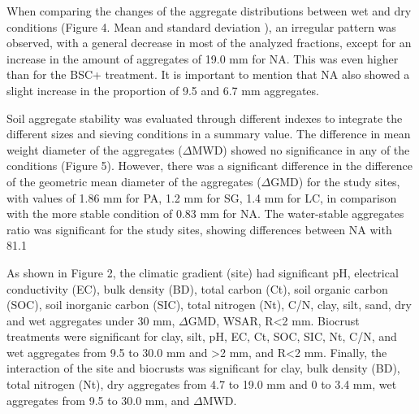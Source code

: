 
When comparing the changes of the aggregate distributions between wet and dry conditions (Figure 4. Mean and standard deviation ), an irregular pattern was observed, with a general decrease in most of the analyzed fractions, except for an increase in the amount of aggregates of 19.0 mm for NA. This was even higher than for the BSC+ treatment. It is important to mention that NA also showed a slight increase in the proportion of 9.5 and 6.7 mm aggregates.


Soil aggregate stability was evaluated through different indexes to integrate the different sizes and sieving conditions in a summary value. The difference in mean weight diameter of the aggregates ($\Delta$MWD) showed no significance in any of the conditions (Figure 5). However, there was a significant difference in the difference of the geometric mean diameter of the aggregates ($\Delta$GMD) for the study sites, with values of 1.86 mm for PA, 1.2 mm for SG, 1.4 mm for LC, in comparison with the more stable condition of 0.83 mm for NA. The water-stable aggregates ratio was significant for the study sites, showing differences between NA with 81.1%


As shown in Figure 2, the climatic gradient (site) had significant pH, electrical conductivity (EC), bulk density (BD), total carbon (Ct), soil organic carbon (SOC), soil inorganic carbon (SIC), total nitrogen (Nt), C/N, clay, silt, sand, dry and wet aggregates under 30 mm, $\Delta$GMD, WSAR, R<2 mm. Biocrust treatments were significant for clay, silt, pH, EC, Ct, SOC, SIC, Nt, C/N, and wet aggregates from 9.5 to 30.0 mm and >2 mm, and R<2 mm. Finally, the interaction of the site and biocrusts was significant for clay, bulk density (BD), total nitrogen (Nt), dry aggregates from 4.7 to 19.0 mm and 0 to 3.4 mm, wet aggregates from 9.5 to 30.0 mm, and $\Delta$MWD.

